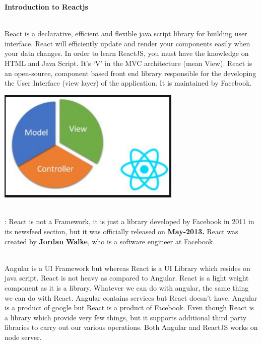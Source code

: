 \documentclass{article}
\begin{document}
\noindent \textbf{Introduction to Reactjs}

\noindent 

\noindent \\
React is a declarative, efficient and flexible java script library for building user interface. React will efficiently update and render your components easily when your data changes. In order to learn ReactJS, you must have the knowledge on HTML and Java Script. It's `V' in the MVC architecture (mean View). React is an open-source, component based front end library responsible for the developing the User Interface (view layer) of the application. It is maintained by Facebook.

\noindent 

\noindent 

\begin{center}
	\noindent \includegraphics*[width=3.45in, height=2.12in]{IMG-06-05}
\end{center}

\noindent 

\noindent 

\noindent 

\noindent \\
\textbf{}: React is not a Framework, it is just a library developed by Facebook in 2011 in its newsfeed section, but it was officially released on \textbf{May-2013.} React was created by \textbf{Jordan} \textbf{Walke}, who is a software engineer at Facebook.

\noindent 

\noindent 

\noindent 

\noindent 

\noindent \\
Angular is a UI Framework but whereas React is a UI Library which resides on java script. React is not heavy as compared to Angular. React is a light weight component as it is a library. Whatever we can do with angular, the same thing we can do with React.  Angular contains services but React doesn't have. Angular is a product of google but React is a product of Facebook. Even though React is a library which provide very few things, but it supports additional third party libraries to carry out our various operations. Both Angular and ReactJS works on node server.
\end{document}
